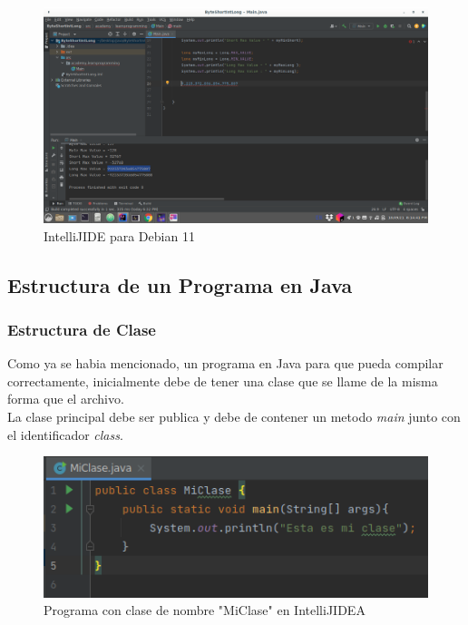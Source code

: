 \documentclass{article}
\begin{document}
		\begin{figure}[H]
			\centering
			\includegraphics[scale = 0.25]{images/ide}
			\caption{IntelliJIDE para Debian 11}
		\end{figure}
	
	\subsection{Estructura de un Programa en Java}
	
		\subsubsection{Estructura de Clase}
		
		Como ya se habia mencionado, un programa en Java para que pueda compilar correctamente, inicialmente debe de tener una clase que se llame de la misma forma que el archivo.\\
		
		La clase principal debe ser publica y debe de contener un metodo \emph{main} junto con el identificador \emph{class}.
		
		\begin{figure}[H]
			\centering
			\includegraphics[scale = 0.8]{images/miclase}
			\caption{Programa con clase de nombre "MiClase" en IntelliJIDEA}
		\end{figure} 
		
\end{document}
